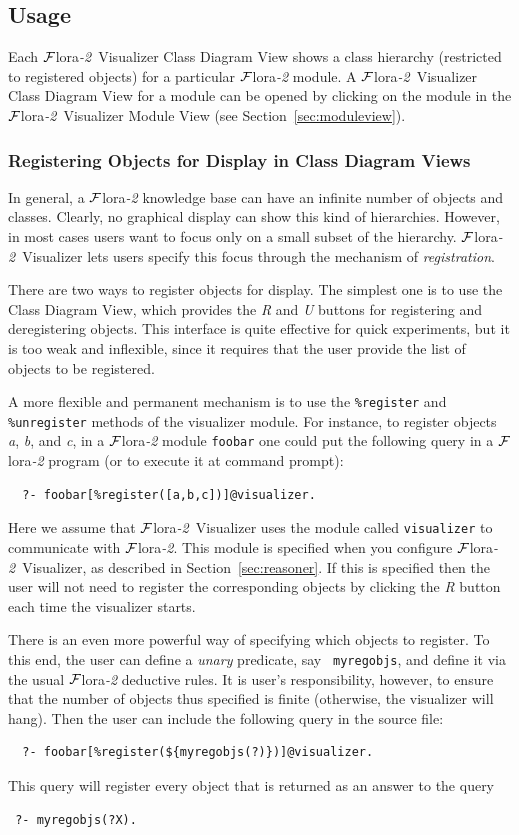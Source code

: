 \documentclass[a4paper,11pt]{article}
\newcommand{\FLORA}{{\mbox{\sc ${\cal F}${lora}\rm\emph{-2}}}\xspace}
\newcommand{\FVIZ}{{\mbox{\sc ${\cal F}${lora}\rm\emph{-2} {Visualizer}}}\xspace}
\begin{document}
\subsection{Usage}
\label{sec:visualizerview_usage}

Each \FVIZ Class Diagram View shows a class hierarchy (restricted to
registered objects) for
a particular \FLORA module. A \FVIZ Class Diagram View for a module
can be opened by
clicking on the module in the \FVIZ Module View (see
Section~\ref{sec:moduleview}).

\subsubsection{Registering Objects for Display in Class Diagram Views}
\label{sec:visualizerview_usage_registration}

In general, a \FLORA knowledge base can have an infinite number of objects
and classes. Clearly, no graphical display can show this kind of hierarchies.
However, in most cases users want to focus only on a small subset of the
hierarchy.  \FVIZ lets users specify this focus through the mechanism of
\emph{registration}.

There are two ways to register objects for display. The simplest one is to
use the Class Diagram View, which provides the \emph{R} and \emph{U}
buttons for registering and deregistering objects. This interface is quite
effective for quick experiments, but it is too weak and inflexible, since
it requires that the user provide the list of objects to be registered.

A more flexible and permanent mechanism is to use the {\tt \%register} and
{\tt \%unregister} methods of the visualizer module.  For instance, to
register objects \emph{a}, \emph{b}, and \emph{c}, in a \FLORA
module {\tt foobar} one could put the following query in a \FLORA program
(or to execute it at command prompt):
\begin{verbatim}
  ?- foobar[%register([a,b,c])]@visualizer.
\end{verbatim}
Here we assume that \FVIZ uses the module called {\tt visualizer}  
to communicate with \FLORA. This module is specified when you configure
\FVIZ, as described in Section~\ref{sec:reasoner}.
If this is specified then the user will not need to register the
corresponding objects by clicking the \emph{R} button each time the
visualizer starts.

There is an even more powerful way of specifying which objects to register.
To this end, the user can define a \emph{unary} predicate, say {\tt
  myregobjs}, and define it via the usual \FLORA deductive rules.  It is
user's responsibility, however, to ensure that the number of objects thus
specified is finite (otherwise, the visualizer will hang).
Then the user can include the following query in the source file:
\begin{verbatim}
  ?- foobar[%register(${myregobjs(?)})]@visualizer.
\end{verbatim}
This query will register every object that is returned as an answer to the query
\begin{verbatim}
 ?- myregobjs(?X).
\end{verbatim}
\end{document}
